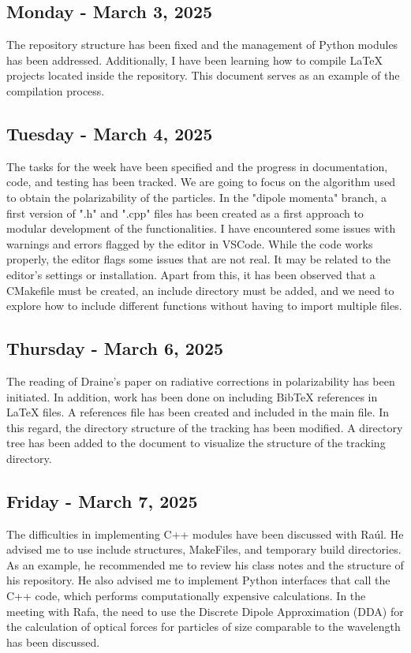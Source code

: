 \documentclass{article}
\begin{document}
\subsection{Monday - March 3, 2025}
The repository structure has been fixed and the management of Python modules has been addressed.
Additionally, I have been learning how to compile LaTeX projects located inside the repository.
This document serves as an example of the compilation process.

\subsection{Tuesday - March 4, 2025}
The tasks for the week have been specified and the progress in documentation, code, and testing has been tracked.
We are going to focus on the algorithm used to obtain the polarizability of the particles. In the "dipole momenta" branch,
a first version of ".h" and ".cpp" files has been created as a first approach to modular development of the functionalities.
I have encountered some issues with warnings and errors flagged by the editor in VSCode. While the code works properly, the editor
flags some issues that are not real. It may be related to the editor's settings or installation.
Apart from this, it has been observed that a CMakefile must be created, an include directory must be added,
and we need to explore how to include different functions without having to import multiple files.

\subsection{Thursday - March 6, 2025}
The reading of Draine's paper on radiative corrections in polarizability has been initiated.
In addition, work has been done on including BibTeX references in LaTeX files.
A references file has been created and included in the main file. In this regard,
the directory structure of the tracking has been modified.
A directory tree has been added to the document to visualize the structure of the tracking directory.

\subsection{Friday - March 7, 2025}
The difficulties in implementing C++ modules have been discussed with Raúl.
He advised me to use include structures, MakeFiles, and temporary build directories.
As an example, he recommended me to review his class notes and the structure of his
 repository. He also advised me to implement Python 
interfaces that call the C++ code, which performs computationally expensive
calculations. In the meeting with Rafa, the need to use the Discrete Dipole
Approximation (DDA) for the calculation of optical forces for particles of size
comparable to the wavelength has been discussed.
\end{document}
